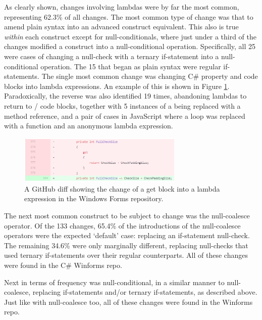 \documentclass{article}
\begin{document}
        As clearly shown, changes involving lambdas were by far the most common, representing 62.3\% of all changes. The most common type of change was that to amend plain syntax into an advanced construct equivalent. This also is true \emph{within} each construct except for null-conditionals, where just under a third of the changes modified a construct into a null-conditional operation. Specifically, all 25 were cases of changing a null-check with a ternary if-statement into a null-conditional operation. The 15 that began as plain syntax were regular if-statements. The single most common change was changing C\# property  and  code blocks into lambda expressions. An example of this is shown in Figure \ref{fig:getSetEx}. Paradoxically, the reverse was also identified 19 times, abandoning lambdas to return to / code blocks, together with 5 instances of a being replaced with a method reference, and a pair of cases in JavaScript where a  loop was replaced with a  function and an anonymous lambda expression.

        \begin{figure}[htbp]
            \centering
            \includegraphics[width=0.7\textwidth]{getSetEx}
            \caption{A GitHub diff showing the change of a get block into a lambda expression in the Windows Forms repository.}
            \label{fig:getSetEx}
        \end{figure}

        The  next most common construct to be subject to change was the null-coalesce operator. Of the 133 changes, 65.4\% of the introductions of the null-coalesce operators were the expected `default' case: replacing an if-statement null-check. The remaining 34.6\% were only marginally different, replacing null-checks that used ternary if-statements over their regular counterparts. All of these changes were found in the C\# Winforms repo.

        Next in terms of frequency was null-conditional, in a similar manner to null-coalesce, replacing if-statements and/or ternary if-statements, as described above. Just like with null-coalesce too, all of these changes were found in the Winforms repo.
\end{document}
